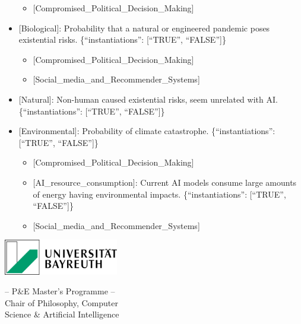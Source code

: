 \documentclass[
  11pt,
  letterpaper,
]{book}
\providecommand{\tightlist}{%
  \setlength{\itemsep}{0pt}\setlength{\parskip}{0pt}}
\begin{document}
\begin{itemize}
  \begin{itemize}
  \tightlist
  \item
    {[}Compromised\_Political\_Decision\_Making{]}
  \end{itemize}
\item
  {[}Biological{]}: Probability that a natural or engineered pandemic
  poses existential risks. \{``instantiations'': {[}``TRUE'',
  ``FALSE''{]}\}

  \begin{itemize}
  \tightlist
  \item
    {[}Compromised\_Political\_Decision\_Making{]}
  \item
    {[}Social\_media\_and\_Recommender\_Systems{]}
  \end{itemize}
\item
  {[}Natural{]}: Non-human caused existential risks, seem unrelated with
  AI. \{``instantiations'': {[}``TRUE'', ``FALSE''{]}\}
\item
  {[}Environmental{]}: Probability of climate catastrophe.
  \{``instantiations'': {[}``TRUE'', ``FALSE''{]}\}

  \begin{itemize}
  \tightlist
  \item
    {[}Compromised\_Political\_Decision\_Making{]}
  \item
    {[}AI\_resource\_consumption{]}: Current AI models consume large
    amounts of energy having environmental impacts.
    \{``instantiations'': {[}``TRUE'', ``FALSE''{]}\}
  \item
    {[}Social\_media\_and\_Recommender\_Systems{]}
  \end{itemize}
\end{itemize}


\backmatter
\printbibliography[title=Bibliography]



\clearpage
\thispagestyle{empty} %

\newpage


\begin{minipage}{0.3\textwidth}
  \includegraphics[width=5cm]{latex/uni-bayreuth-logo.png}
\end{minipage}
\hfill
\begin{minipage}{0.9\textwidth}
  \begin{center}
    -- P\&E Master's Programme --\\
    Chair of Philosophy, Computer\\
    Science \& Artificial Intelligence
  \end{center}
\end{minipage}
\end{document}
